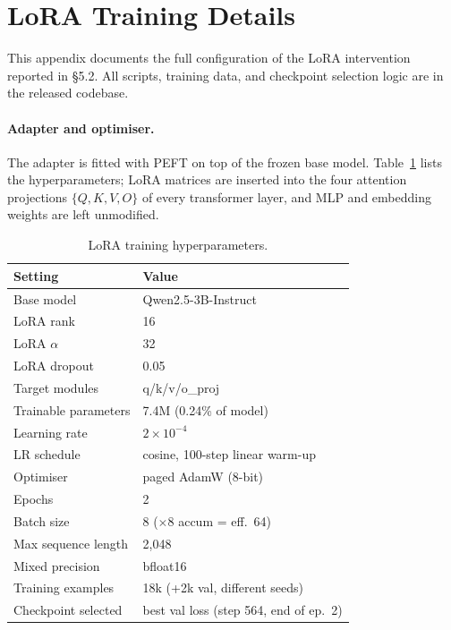 \documentclass[letterpaper]{article} %
\begin{document}
\section{LoRA Training Details}
\label{app:lora}

This appendix documents the full configuration of the LoRA
intervention reported in \S5.2.
All scripts, training data, and checkpoint selection logic are in
the released codebase.

\paragraph{Adapter and optimiser.}
The adapter is fitted with PEFT \citep{hu2021lora} on top of the
frozen base model.
Table~\ref{tab:lora_hparams} lists the hyperparameters; LoRA matrices
are inserted into the four attention projections $\{Q, K, V, O\}$ of
every transformer layer, and MLP and embedding weights are left
unmodified.

\begin{table}[!htbp]
\centering
\footnotesize
\setlength{\tabcolsep}{4pt}
\begin{tabular}{ll}
\toprule
\textbf{Setting} & \textbf{Value} \\
\midrule
Base model           & Qwen2.5-3B-Instruct \\
LoRA rank            & 16 \\
LoRA $\alpha$        & 32 \\
LoRA dropout         & 0.05 \\
Target modules       & q/k/v/o\_proj \\
Trainable parameters & 7.4M (0.24\% of model) \\
\midrule
Learning rate        & $2 \times 10^{-4}$ \\
LR schedule          & cosine, 100-step linear warm-up \\
Optimiser            & paged AdamW (8-bit) \\
Epochs               & 2 \\
Batch size           & 8 ($\times$8 accum = eff.\ 64) \\
Max sequence length  & 2{,}048 \\
Mixed precision      & bfloat16 \\
\midrule
Training examples    & 18k (+2k val, different seeds) \\
Checkpoint selected  & best val loss (step 564, end of ep.\ 2) \\
\bottomrule
\end{tabular}
\caption{LoRA training hyperparameters.}
\label{tab:lora_hparams}
\end{table}
\end{document}
